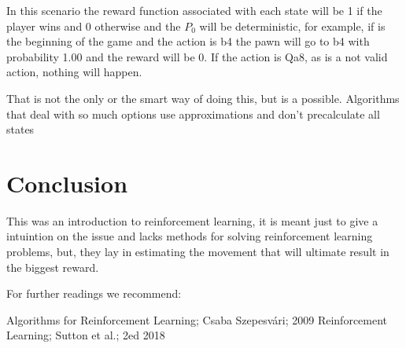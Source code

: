 \documentclass{article}
\begin{document}
In this scenario the reward function associated with each state will be 1 if the player wins and 0 otherwise and the $P_0$ will be deterministic, for example, if is the beginning of the game and the action is b4 the pawn will go to b4 with probability 1.00 and the reward will be 0. If the action is Qa8, as is a not valid action, nothing will happen.

That is not the only or the smart way of doing this, but is a possible. Algorithms that deal with so much options use approximations and don't precalculate all states

\section{Conclusion}

This was an introduction to reinforcement learning, it is meant just to give a intuintion on the issue and lacks methods for solving reinforcement learning problems, but, they lay in estimating the movement that will ultimate result in the biggest reward.

For further readings we recommend:

Algorithms for Reinforcement Learning; Csaba Szepesvári; 2009
Reinforcement Learning; Sutton et al.; 2ed 2018
\end{document}
